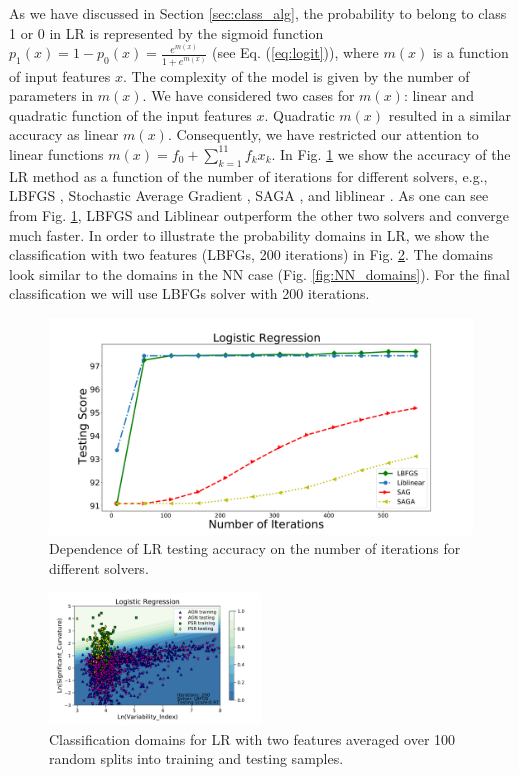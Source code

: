 As we have discussed in Section \ref{sec:class_alg}, 
the probability to belong to class 1 or 0 in LR is represented by the sigmoid function
$p_1(x) = 1 - p_0(x) = \frac{e^{m(x)}}{1 + e^{m(x)}}$ (see Eq. (\ref{eq:logit})),
where $m(x)$ is a function of input features $x$.
The complexity of the model is given by the number of parameters in $m(x)$.
We have considered two cases for $m(x)$: linear and quadratic function of the input features $x$.
Quadratic $m(x)$ resulted in a similar accuracy as linear $m(x)$.
Consequently, we have restricted our attention to linear functions $m(x) = f_0 + \sum_{k = 1}^{11} f_k x_k$.
In Fig. \ref{fig:LR_accuracy} we show the accuracy of the LR method as a function of the number of iterations
for different solvers, e.g., LBFGS \citep{lbfgs}, Stochastic Average Gradient \citep[SAG,][]{sag}, SAGA \citep[a variant of SAG,][]{saga},
and liblinear \citep[a special solver for LR and support vector machine classifications,][]{ll}.
As one can see from Fig. \ref{fig:LR_accuracy}, LBFGS and Liblinear outperform the other two solvers and converge much faster.
In order to illustrate the probability domains in LR, we show the classification with two features (LBFGs, 200 iterations)
in Fig. \ref{fig:LR_domains}. The domains look similar to the domains in the NN case (Fig. \ref{fig:NN_domains}).
For the final classification we will use LBFGs solver with 200 iterations.


\begin{figure}[h]
\centering
\includegraphics[width=\twopicsp\textwidth]{plots/lr_train_assocnewfeat.pdf}
\caption{Dependence of LR testing accuracy on the number of iterations for different solvers.}
\label{fig:LR_accuracy}
\end{figure}



\begin{figure}[h]
\centering
\includegraphics[width=0.5\textwidth]{plots/classification_domains/lr_200_lbfgs.pdf}
\caption{Classification domains for LR with two features 
averaged over 100 random splits into training and testing samples.}
\label{fig:LR_domains}
\end{figure}


